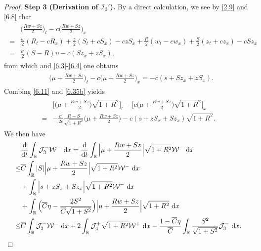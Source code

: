 \documentclass[11pt,reqno]{article}
\newcommand{\fr}{\frac}
\numberwithin{equation}{section}
\begin{document}
\begin{proof}
\textbf{Step 3 (Derivation of $\mathcal{I}_{3}'$).}
By a direct calculation, we see by \eqref{2.9} and \eqref{6.8} that
\begin{align}\label{6.35a}
\begin{split}
&\Big(\fr{Rw+Sz}{2}\Big)_t-c\Big(\fr{Rw+Sz}{2}\Big)_x \\
=&\fr{w}{2}(R_t-cR_x)+\fr{z}{2}(S_t+cS_x) -czS_x  +\fr{R}{2}(w_t-cw_x) +\fr{S}{2}(z_t+cz_x) -cSz_x \\
=&\fr{c'}{2}(S-R)\upsilon- c(Sz_x+zS_x),
\end{split}
\end{align}
from which and \eqref{6.3}-\eqref{6.4} one obtains
\begin{align}\label{6.35b}
\begin{split}
&\Big(\mu +\fr{Rw+Sz}{2}\Big)_t-c\Big(\mu+\fr{Rw+Sz}{2}\Big)_x =- c(s+Sz_x+zS_x).
\end{split}
\end{align}
Combing \eqref{6.11} and \eqref{6.35b} yields
\begin{align}\label{6.35c}
\begin{split}
&\Big[\Big(\mu +\fr{Rw+Sz}{2}\Big)\sqrt{1+R^2}\Big]_t -\Big[c\Big(\mu +\fr{Rw+Sz}{2}\Big)\sqrt{1+R^2}\Big]_x \\
=&-\fr{c'}{2c}\fr{R-S}{\sqrt{1+R^2}}\Big(\mu +\fr{Rw+Sz}{2}\Big) -c(s+zS_x +Sz_x)\sqrt{1+R^2}.
\end{split}
\end{align}
We then have
\begin{align}\label{6.35d}
\begin{split}
&\fr{{\rm d}}{{\rm d}t}\int_{\mathbb{R}} \mathcal{J}_{3}^-\mathcal{W}^-\ {\rm d}x=\fr{{\rm d}}{{\rm d}t}\int_{\mathbb{R}} \Big|\mu +\fr{Rw+Sz}{2}\Big|\sqrt{1+R^2}\mathcal{W}^-\ {\rm d}x \\
\leq & \overline{C}\int_{\mathbb{R}}  |S|\Big|\mu +\fr{Rw+Sz}{2}\Big|\sqrt{1+R^2}\mathcal{W}^-\ {\rm d}x \\
&+\int_{\mathbb{R}}  \Big|s+zS_x+Sz_x\Big|\sqrt{1+R^2}\mathcal{W}^-\ {\rm d}x \\
&+\int_{\mathbb{R}}  \Big(\overline{C}\eta-\fr{2S^2}{\overline{C}\sqrt{1+S^2}}\Big) \Big|\mu +\fr{Rw+Sz}{2}\Big|\sqrt{1+R^2}\ {\rm d}x
\\
\leq & \overline{C}\int_{\mathbb{R}}  \mathcal{J}_{3}^-\mathcal{W}^-\ {\rm d}x  +2\int_{\mathbb{R}}  \mathcal{J}_{4}^+\sqrt{1+R^2}\mathcal{W}^+\ {\rm d}x  -\fr{1-\overline{C}\eta}{\overline{C}}\int_{\mathbb{R}}  \fr{S^2}{\sqrt{1+S^2}} \mathcal{J}_{3}^-\ {\rm d}x.
\end{split}

\end{align}
\end{proof}
\end{document}
